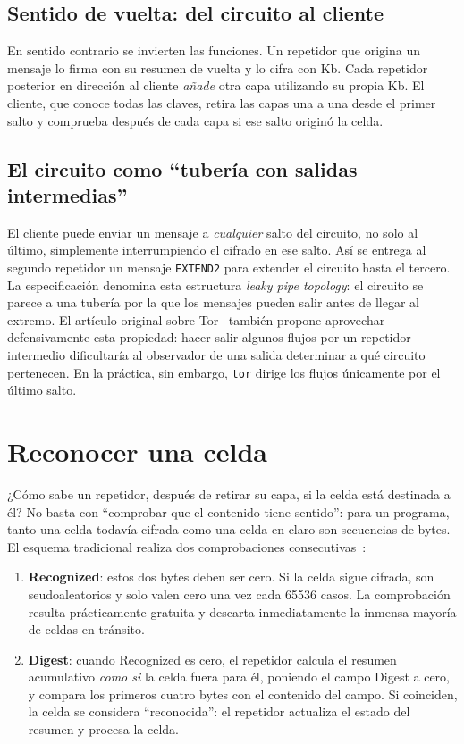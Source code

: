 \subsection{Sentido de vuelta: del circuito al cliente}

En sentido contrario se invierten las funciones. Un repetidor que origina un mensaje lo firma con su resumen de vuelta y lo cifra con Kb. Cada repetidor posterior en dirección al cliente \emph{añade} otra capa utilizando su propia Kb. El cliente, que conoce todas las claves, retira las capas una a una desde el primer salto y comprueba después de cada capa si ese salto originó la celda.

\subsection{El circuito como \enquote{tubería con salidas intermedias}}

El cliente puede enviar un mensaje a \emph{cualquier} salto del circuito, no solo al último, simplemente interrumpiendo el cifrado en ese salto. Así se entrega al segundo repetidor un mensaje \texttt{EXTEND2} para extender el circuito hasta el tercero. La especificación denomina esta estructura \emph{leaky pipe topology}: el circuito se parece a una tubería por la que los mensajes pueden salir antes de llegar al extremo. El artículo original sobre Tor~\cite{dingledine2004tor} también propone aprovechar defensivamente esta propiedad: hacer salir algunos flujos por un repetidor intermedio dificultaría al observador de una salida determinar a qué circuito pertenecen. En la práctica, sin embargo, \texttt{tor} dirige los flujos únicamente por el último salto.

\section{Reconocer una celda}\label{sec:riconoscere}

¿Cómo sabe un repetidor, después de retirar su capa, si la celda está destinada a él? No basta con \enquote{comprobar que el contenido tiene sentido}: para un programa, tanto una celda todavía cifrada como una celda en claro son secuencias de bytes. El esquema tradicional realiza dos comprobaciones consecutivas~:

\begin{enumerate}
  \item \textbf{Recognized}: estos dos bytes deben ser cero. Si la celda sigue cifrada, son seudoaleatorios y solo valen cero una vez cada \num{65536} casos. La comprobación resulta prácticamente gratuita y descarta inmediatamente la inmensa mayoría de celdas en tránsito.
  \item \textbf{Digest}: cuando Recognized es cero, el repetidor calcula el resumen acumulativo \emph{como si} la celda fuera para él, poniendo el campo Digest a cero, y compara los primeros cuatro bytes con el contenido del campo. Si coinciden, la celda se considera \enquote{reconocida}: el repetidor actualiza el estado del resumen y procesa la celda.
\end{enumerate}

